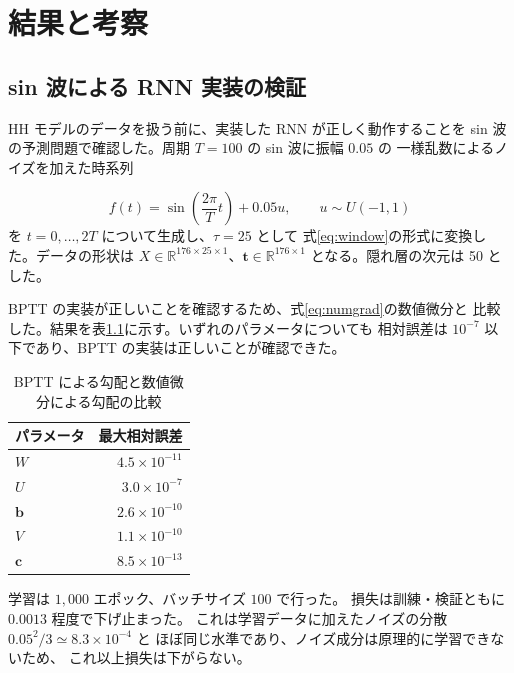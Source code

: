 \documentclass[a4paper,11pt,openany]{ltjsreport}
\begin{document}
\chapter{結果と考察}

\section{sin 波による RNN 実装の検証}
\label{sec:sin_result}

HH モデルのデータを扱う前に、実装した RNN が正しく動作することを
sin 波の予測問題で確認した。周期 $T = 100$ の sin 波に振幅 $0.05$ の
一様乱数によるノイズを加えた時系列

\begin{equation}
  f(t) = \sin\left(\frac{2\pi}{T}t\right) + 0.05u, \qquad u \sim U(-1,1)
  \label{eq:toy}
\end{equation}
を $t = 0, \dots, 2T$ について生成し、$\tau = 25$ として
式\eqref{eq:window}の形式に変換した。データの形状は
$X \in \mathbb{R}^{176 \times 25 \times 1}$、$\bm{t} \in \mathbb{R}^{176 \times 1}$
となる。隠れ層の次元は 50 とした。

BPTT の実装が正しいことを確認するため、式\eqref{eq:numgrad}の数値微分と
比較した。結果を表\ref{tab:gradcheck}に示す。いずれのパラメータについても
相対誤差は $10^{-7}$ 以下であり、BPTT の実装は正しいことが確認できた。

\begin{table}[tbp]
  \centering
  \caption{BPTT による勾配と数値微分による勾配の比較}
  \label{tab:gradcheck}
  \begin{tabular}{lr}
    \toprule
    パラメータ & 最大相対誤差 \\
    \midrule
    $W$       & $4.5 \times 10^{-11}$ \\
    $U$       & $3.0 \times 10^{-7}$ \\
    $\bm{b}$  & $2.6 \times 10^{-10}$ \\
    $V$       & $1.1 \times 10^{-10}$ \\
    $\bm{c}$  & $8.5 \times 10^{-13}$ \\
    \bottomrule
  \end{tabular}
\end{table}

学習は $1{,}000$ エポック、バッチサイズ $100$ で行った。
損失は訓練・検証ともに $0.0013$ 程度で下げ止まった。
これは学習データに加えたノイズの分散 $0.05^2/3 \simeq 8.3\times10^{-4}$ と
ほぼ同じ水準であり、ノイズ成分は原理的に学習できないため、
これ以上損失は下がらない。
\end{document}
